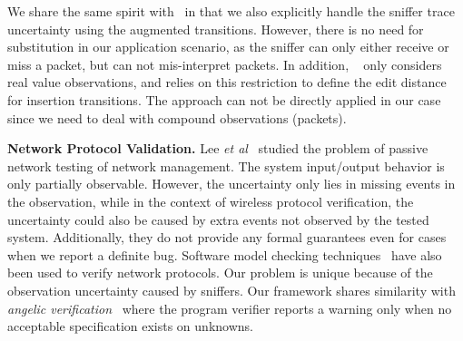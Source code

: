 We share the same spirit with~\cite{jakvsic2016quantitative} in that we also
explicitly handle the sniffer trace uncertainty using the augmented transitions.
However, there is no need for substitution in our application scenario, as the
sniffer can only either receive or miss a packet, but can not mis-interpret
packets. In addition, ~\cite{jakvsic2016quantitative} only considers real value
observations, and relies on this restriction to define the edit distance for
insertion transitions. The approach can not be directly applied in our case
since we need to deal with compound observations (packets).

\textbf{Network Protocol Validation.} Lee \textit{et al}~\cite{lee1997passive}
studied the problem of passive network testing of network management. The system
input/output behavior is only partially observable. However, the uncertainty
only lies in missing events in the observation, while in the context of wireless
protocol verification, the uncertainty could also be caused by extra events not
observed by the tested system. Additionally, they do not provide any formal
guarantees even for cases when we report a definite bug.  Software model
checking techniques~\cite{musuvathi2002cmc,godefroid1997model} have also been
used to verify network protocols. Our problem is unique because of the
observation uncertainty caused by sniffers. Our framework shares similarity
with {\it angelic verification}~\cite{das-cav15} where the program verifier
reports a warning only when no acceptable specification exists on unknowns.

\begin{comment}
\textbf{Sniffer Trace Analysis.} Wireless sniffers has been widely used to
analyze MAC layer behaviors of enterprise wireless
networks~\cite{sheng:wicom2008,tan:tmc2014,yeo-wise04,yeo:witmemo2005}.
Jigsaw~\cite{Cheng:2006:JSP:1159913.1159920} is a larger scale wireless network
monitoring infrastructure. 150~radio monitors were deployed in a campus
building. Traces collected from multiple sniffers were merged and synchronized
to restructure the link and transportation layer conversations. Protocol
specific heuristics were developed to infer the missing packets. The work
in~\cite{Mahajan:2006:AMB:1159913.1159923} shared the same idea of trace merging
with Jigsaw, but uses a FSM to infer packet reception. These works assume the
correctness of the protocol implementation in order to infer missing packets,
while we systematically encode the uncertainty of sniffer traces for
verification purpose.
\end{comment}


